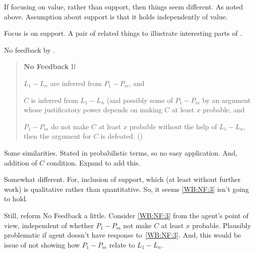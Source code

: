 \begin{note}
  If focusing on value, rather than support, then things seem  different.
  As noted above.
  Assumption about support is that it holds independently of value.
\end{note}


\begin{note}
  Focus is on support.
  A pair of related things to illustrate interesting parts of \nI{}.
\end{note}

\begin{note}
  No feedback by \citeauthor{Weisberg:2010to}.

  \begin{quote}
    \textbf{No Feedback} If
    \begin{enumerate*}[label=(\roman*), ref=(\roman*)]
    \item\label{WB:NF:1} \(L_{1}-L_{n}\) are inferred from \(P_{1}-P_{m}\), and
    \item\label{WB:NF:2} \(C\) is inferred from \(L_{1}-L_{n}\) (and possibly some of \(P_{1}-P_{m}\) by an argument whose justificatory power depends on making \(C\) at least \(x\) probable, and
    \item\label{WB:NF:3} \(P_{1}-P_{m}\) do not make \(C\) at least \(x\) probable without the help of \(L_{1}-L_{n}\), then the argument for \(C\) is defeated.\nolinebreak
      \mbox{}\hfill\mbox{(\citeyear[533--534]{Weisberg:2010to})}
    \end{enumerate*}
  \end{quote}

  Some similarities.
  Stated in probabilistic terms, so no easy application.
  And, addition of \(C\) condition.
  Expand to add this.

  Somewhat different.
  For, inclusion of support, which (at least without further work) is qualitative rather than quantitative.
  So, it seems \ref{WB:NF:3} isn't going to hold.

  Still, reform No Feedback a little.
  Consider \ref{WB:NF:3} from the agent's point of view, independent of whether \(P_{1}-P_{m}\) not make \(C\) at least \(x\) probable.
  Plausibly problematic if agent doesn't have response to~\ref{WB:NF:3}.
  And, this would be issue of not showing how \(P_{1}-P_{m}\) relate to \(L_{1}-L_{n}\).
\end{note}

